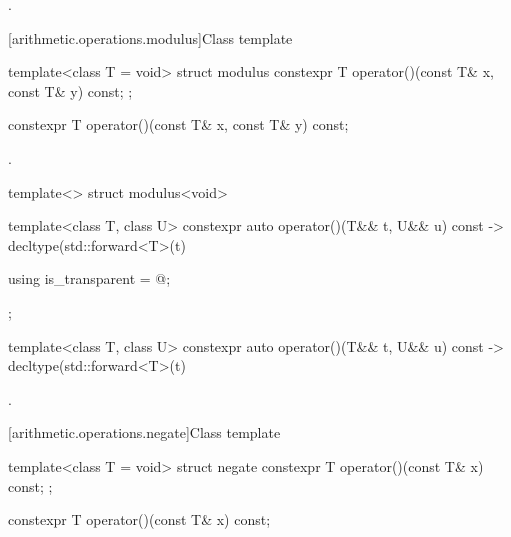 \begin{itemdescr}
\pnum\returns {}.
\end{itemdescr}

[arithmetic.operations.modulus]{Class template }

%
\begin{itemdecl}
template<class T = void> struct modulus {
  constexpr T operator()(const T& x, const T& y) const;
};
\end{itemdecl}

%
\begin{itemdecl}
constexpr T operator()(const T& x, const T& y) const;
\end{itemdecl}

\begin{itemdescr}
\pnum\returns {}.
\end{itemdescr}

%
\begin{itemdecl}
template<> struct modulus<void> {
  template<class T, class U> constexpr auto operator()(T&& t, U&& u) const
    -> decltype(std::forward<T>(t) %

  using is_transparent = @\unspec@;
};
\end{itemdecl}

%
\begin{itemdecl}
template<class T, class U> constexpr auto operator()(T&& t, U&& u) const
    -> decltype(std::forward<T>(t) %
\end{itemdecl}

\begin{itemdescr}
\pnum\returns {}.
\end{itemdescr}

[arithmetic.operations.negate]{Class template }

%
\begin{itemdecl}
template<class T = void> struct negate {
  constexpr T operator()(const T& x) const;
};
\end{itemdecl}

%
\begin{itemdecl}
constexpr T operator()(const T& x) const;
\end{itemdecl}


